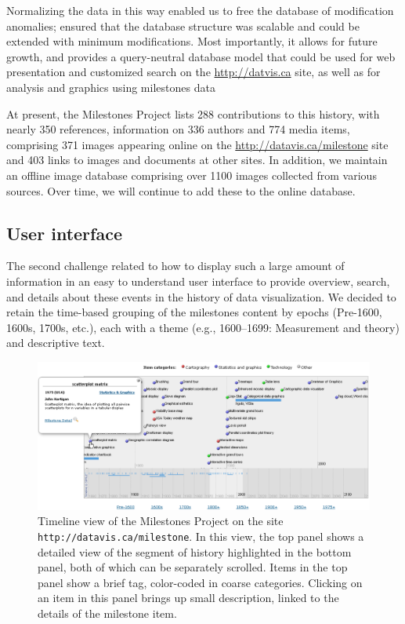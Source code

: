 Normalizing the data in this way enabled us to free the database of modification anomalies; ensured that the database 
structure was scalable and could be extended with minimum modifications.
Most importantly, it allows for future growth, and provides a query-neutral database model
\citep{Codd:1971} that could be used for web presentation and customized search
on the \url{http://datvis.ca} site, 
as well as for analysis and graphics using milestones data

At present, the Milestones Project lists 288 contributions to this history, with nearly 350 references,
information on 336 authors and 774 media items, comprising 371 images appearing online on the
\url{http://datavis.ca/milestone} site and 403 links to images and documents at other sites.
In addition, we maintain an offline image database comprising over 1100 images collected from
various sources. Over time, we will continue to add these to the online database.

\subsection{User interface}
The second challenge related to how to display such a large amount of information in an easy to understand
user interface to provide overview, search, and details about these events in the history of
data visualization. We decided to retain the time-based grouping of the milestones content by 
epochs (Pre-1600, 1600s, 1700s, etc.), each with a theme (e.g., 1600--1699: Measurement and theory)
and descriptive text.

\begin{figure}[!htb]
  \centering
  \includegraphics[width=\textwidth,clip]{fig/datavis-timeline2}
  \caption{Timeline view of the Milestones Project on the site \texttt{http://datavis.ca/milestone}. In this view,
  the top panel shows a detailed view of the segment of history highlighted in the bottom panel, both
  of which can be separately scrolled. Items in the top panel show a brief tag, color-coded in coarse
  categories. Clicking on an item in this panel brings up small description, linked to the details of
  the milestone item.
  }
  \label{fig:datavis-timeline2}
\end{figure}

